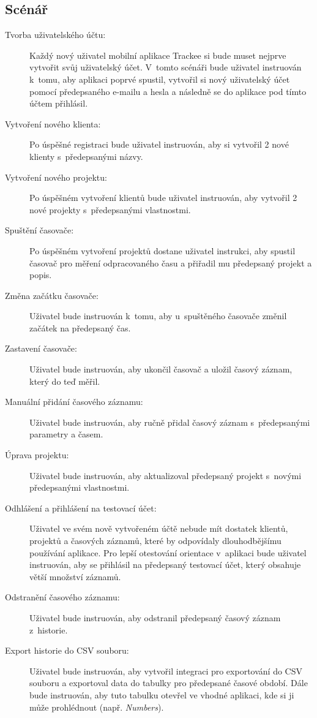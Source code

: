 \subsection{Scénář}

\begin{description}
\item[Tvorba uživatelského účtu:] Každý nový uživatel mobilní aplikace Trackee si bude muset nejprve vytvořit svůj uživatelský účet. V~tomto scénáři bude uživatel instruován k~tomu, aby aplikaci poprvé spustil, vytvořil si nový uživatelský účet pomocí předepsaného e-mailu a hesla a následně se do aplikace pod tímto účtem přihlásil. 
\item[Vytvoření nového klienta:] Po úspěšné registraci bude uživatel instruován, aby si vytvořil 2 nové klienty s~předepsanými názvy.
\item[Vytvoření nového projektu:] Po úspěšném vytvoření klientů bude uživatel instruován, aby vytvořil 2 nové projekty s~předepsanými vlastnostmi.
\item[Spuštění časovače:] Po úspěšném vytvoření projektů dostane uživatel instrukci, aby spustil časovač pro měření odpracovaného času a přiřadil mu předepsaný projekt a popis.
\item[Změna začátku časovače:] Uživatel bude instruován k~tomu, aby u~spuštěného časovače změnil začátek na předepsaný čas.
\item[Zastavení časovače:] Uživatel bude instruován, aby ukončil časovač a uložil časový záznam, který do teď měřil.
\item[Manuální přidání časového záznamu:] Uživatel bude instruován, aby ručně přidal časový záznam s~předepsanými parametry a časem.
\item[Úprava projektu:] Uživatel bude instruován, aby aktualizoval předepsaný projekt s~novými předepsanými vlastnostmi.
\item[Odhlášení a přihlášení na testovací účet:] Uživatel ve svém nově vytvořeném účtě nebude mít dostatek klientů, projektů a časových záznamů, které by odpovídaly dlouhodbějšímu používání aplikace. Pro lepší otestování orientace v~aplikaci bude uživatel instruován, aby se přihlásil na předepsaný testovací účet, který obsahuje větší množství záznamů.
\item[Odstranění časového záznamu:] Uživatel bude instruován, aby odstranil předepsaný časový záznam z~historie.
\item[Export historie do CSV souboru:] Uživatel bude instruován, aby vytvořil integraci pro exportování do CSV souboru a exportoval data do tabulky pro předepsané časové období. Dále bude instruován, aby tuto tabulku otevřel ve vhodné aplikaci, kde si ji může prohlédnout (např. \emph{Numbers}).

\end{description}
